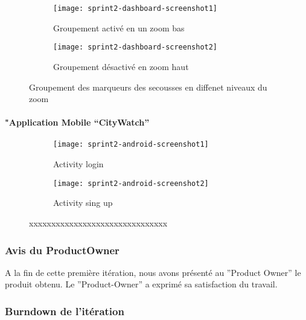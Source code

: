 \begin{figure}[htbp]
    \begin{subfigure}{.5\textwidth}
    \centering
  \centering
  \texttt{[image: sprint2-dashboard-screenshot1]}
  \caption{Groupement activé en un zoom bas}
  \label{fig:sprint2-dashboard-screenshot1}
\end{subfigure}
\begin{subfigure}{.5\textwidth}
    \centering
  \centering
  \texttt{[image: sprint2-dashboard-screenshot2]}
  \caption{Groupement désactivé en zoom haut}
  \label{fig:sprint2-dashboard-screenshot2}
\end{subfigure}
\caption{Groupement des marqueurs des secousses en diffenet niveaux du zoom}
\end{figure}

\paragraph{"Application Mobile ``CityWatch''}
\begin{figure}[htbp]
    \begin{subfigure}{.5\textwidth}
    \centering
  \centering
  \texttt{[image: sprint2-android-screenshot1]}
  \caption{Activity login}
  \label{fig:sprint2-android-screenshot1}
\end{subfigure}
\begin{subfigure}{.5\textwidth}
    \centering
  \centering
  \texttt{[image: sprint2-android-screenshot2]}
  \caption{Activity sing up}
  \label{fig:sprint2-android-screenshot2}
\end{subfigure}
\caption{xxxxxxxxxxxxxxxxxxxxxxxxxxxxxxx}
\end{figure}

\subsubsection{Avis du ProductOwner}
A la fin de cette première itération, nous avons présenté au ”Product Owner” le produit
obtenu. Le ”Product-Owner” a exprimé sa satisfaction du travail.

\subsubsection{Burndown de l’itération}
